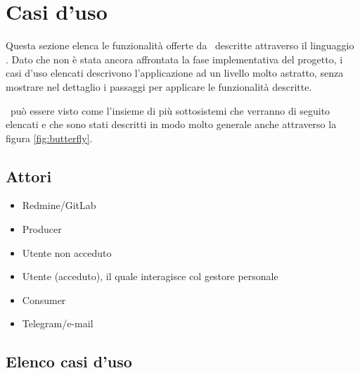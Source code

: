 \section{Casi d'uso}
Questa sezione elenca le funzionalità offerte da \progetto\ descritte attraverso il linguaggio . Dato che non è stata ancora affrontata la fase implementativa del progetto, i casi d'uso elencati descrivono l'applicazione ad un livello molto astratto, senza mostrare nel dettaglio i passaggi per applicare le funzionalità descritte.

\progetto\ può essere visto come l'insieme di più sottosistemi che verranno di seguito elencati e che sono stati descritti in modo molto generale anche attraverso la figura \ref{fig:butterfly}.
	
	\subsection{Attori}
	\begin{itemize}
		\item Redmine/GitLab
		\item Producer
		\item Utente non acceduto
		\item Utente (acceduto), il quale interagisce col gestore personale
		\item Consumer
		\item Telegram/e-mail
	\end{itemize}
	
	\subsection{Elenco casi d'uso}



